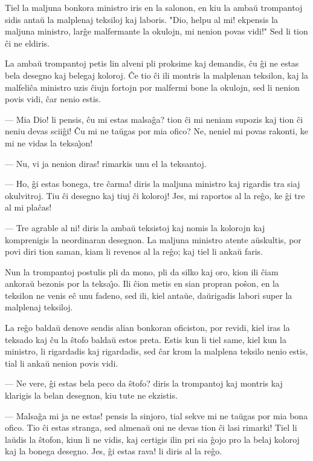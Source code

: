    Tiel la maljuna bonkora ministro iris en la salonon, en kiu la amba\u u
trompantoj sidis anta\u u la malplenaj teksiloj kaj laboris. "Dio,
helpu al mi! ekpensis la maljuna ministro, lar\^ge malfermante la
okulojn, mi nenion povas vidi!" Sed li tion \^ci ne eldiris.

   La amba\u u trompantoj petis lin alveni pli proksime kaj demandis, \^cu
\^gi ne estas bela desegno kaj belegaj koloroj. \^Ce tio \^ci ili
montris la malplenan teksilon, kaj la malfeli\^ca ministro uzis
\^ciujn fortojn por malfermi bone la okulojn, sed li nenion povis
vidi, \^car nenio estis.

 --- Mia Dio! li pensis, \^cu mi estas malsa\^ga? tion \^ci mi neniam
supozis kaj tion \^ci neniu devas scii\^gi! \^Cu mi ne ta\u ugas por
mia ofico? Ne, neniel mi povas rakonti, ke mi ne vidas la
teksa\^{\j}on!

 --- Nu, vi ja nenion diras! rimarkis unu el la teksantoj.

 --- Ho, \^gi estas bonega, tre \^carma! diris la maljuna ministro kaj
rigardis tra siaj okulvitroj. Tiu \^ci desegno kaj tiuj \^ci
koloroj! Jes, mi raportos al la re\^go, ke \^gi tre al mi pla\^cas!

 --- Tre agrable al ni! diris la amba\u u teksistoj kaj nomis la kolorojn
kaj komprenigis la neordinaran desegnon. La maljuna ministro atente
a\u uskultis, por povi diri tion saman, kiam li revenos al la
re\^go; kaj tiel li anka\u u faris.

   Nun la trompantoj postulis pli da mono, pli da silko kaj oro, kion
ili \^ciam ankora\u u bezonis por la teksa\^{\j}o. Ili \^cion metis
en sian propran po\^son, en la teksilon ne venis e\^c unu fadeno,
sed ili, kiel anta\u ue, da\u urigadis labori super la malplenaj
teksiloj.

   La re\^go balda\u u denove sendis alian bonkoran oficiston, por revidi,
kiel iras la teksado kaj \^cu la \^stofo balda\u u estos preta.
Estis kun li tiel same, kiel kun la ministro, li rigardadis kaj
rigardadis, sed \^car krom la malplena teksilo nenio estis, tial li
anka\u u nenion povis vidi.

 --- Ne vere, \^gi estas bela peco da \^stofo? diris la trompantoj kaj
montris kaj klarigis la belan desegnon, kiu tute ne ekzistis.

 --- Malsa\^ga mi ja ne estas! pensis la sinjoro, tial sekve mi ne
ta\u ugas por mia bona ofico. Tio \^ci estas stranga, sed almena\u u
oni ne devas tion \^ci lasi rimarki! Tiel li la\u udis la \^stofon,
kiun li ne vidis, kaj certigis ilin pri sia \^gojo pro la belaj
koloroj kaj la bonega desegno. Jes, \^gi estas rava! li diris al la
re\^go.

